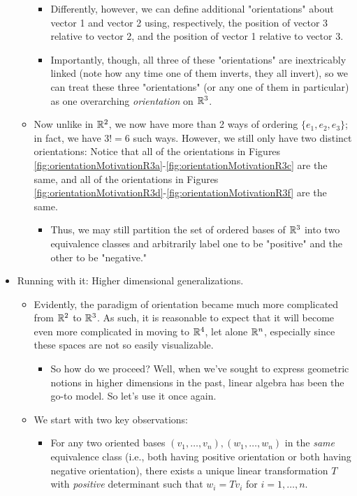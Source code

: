 \documentclass[../notes.tex]{subfiles}
\begin{document}
\begin{itemize}
\begin{itemize}
\begin{itemize}
            \item Differently, however, we can define additional "orientations" about vector 1 and vector 2 using, respectively, the position of vector 3 relative to vector 2, and the position of vector 1 relative to vector 3.
            \item Importantly, though, all three of these "orientations" are inextricably linked (note how any time one of them inverts, they all invert), so we can treat these three "orientations" (or any one of them in particular) as one overarching \emph{orientation} on $\mathbb{R}^3$.
        \end{itemize}
        \item Now unlike in $\mathbb{R}^2$, we now have more than 2 ways of ordering $\{e_1,e_2,e_3\}$; in fact, we have $3!=6$ such ways. However, we still only have two distinct orientations: Notice that all of the orientations in Figures \ref{fig:orientationMotivationR3a}-\ref{fig:orientationMotivationR3c} are the same, and all of the orientations in Figures \ref{fig:orientationMotivationR3d}-\ref{fig:orientationMotivationR3f} are the same.
        \begin{itemize}
            \item Thus, we may still partition the set of ordered bases of $\mathbb{R}^3$ into two equivalence classes and arbitrarily label one to be "positive" and the other to be "negative."
        \end{itemize}
    \end{itemize}
    \item Running with it: Higher dimensional generalizations.
    \begin{itemize}
        \item Evidently, the paradigm of orientation became much more complicated from $\mathbb{R}^2$ to $\mathbb{R}^3$. As such, it is reasonable to expect that it will become even more complicated in moving to $\mathbb{R}^4$, let alone $\mathbb{R}^n$, especially since these spaces are not so easily visualizable.
        \begin{itemize}
            \item So how do we proceed? Well, when we've sought to express geometric notions in higher dimensions in the past, linear algebra has been the go-to model. So let's use it once again.
        \end{itemize}
        \item We start with two key observations:
        \begin{itemize}
            \item For any two oriented bases $(v_1,\dots,v_n),(w_1,\dots,w_n)$ in the \emph{same} equivalence class (i.e., both having positive orientation or both having negative orientation), there exists a unique linear transformation $T$ with \emph{positive} determinant such that $w_i=Tv_i$ for $i=1,\dots,n$.

\end{itemize}
\end{itemize}
\end{itemize}
\end{document}
